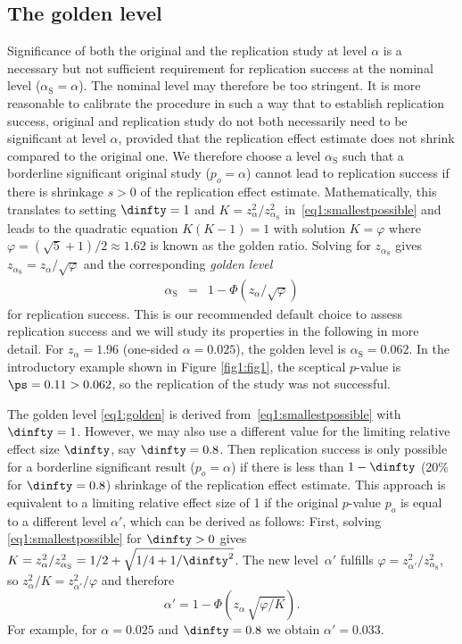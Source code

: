 \subsection{The golden level}\label{sec1:goldenthresh}
Significance of both the original and the replication study at level $\alpha$ is
a necessary but not sufficient requirement for replication success at the
nominal level ($\alpha_{\mathrm{S}} = \alpha$). The nominal level may therefore
be too stringent. It is more reasonable to calibrate the procedure in such a way
that to establish replication success, original and replication study do not
both necessarily need to be significant at level $\alpha$, provided that the
replication effect estimate does not shrink compared to the original one. We
therefore choose a level $\alpha_{\mathrm{S}}$ such that a borderline
significant original study ($p_o = \alpha$) cannot lead to replication success
if there is shrinkage $s > 0$ of the replication effect estimate.
Mathematically, this translates to setting $\dinfty = 1$ and
\mbox{$K = z_\alpha^2/z_{\alpha_{\mathrm{S}}}^2$}
in~\eqref{eq1:smallestpossible} and leads to the quadratic equation $K(K-1) = 1$
with solution $K = \varphi$ where \mbox{$\varphi = (\sqrt{5}+1)/2 \approx 1.62$}
is known as the golden ratio. Solving for $z_{\alpha_{\mathrm{S}}}$ gives
$z_{\alpha_{\mathrm{S}}} = z_\alpha / \sqrt{\varphi}$ and the corresponding
\textit{golden level}
\begin{eqnarray}\label{eq1:golden}
\alpha_{\mathrm{S}} & = & 1 -  \Phi(z_\alpha / \sqrt{\varphi} )
\end{eqnarray}
for replication success. This is our recommended default choice to assess
replication success and we will study its properties in the following in more
detail. For $z_\alpha = 1.96$ (one-sided $\alpha = 0.025$), the golden level is
$\alpha_{\mathrm{S}} =0.062$. In the introductory example shown in Figure
\ref{fig1:fig1}, the sceptical $p$-value is $\ps=0.11 > 0.062$, so the
replication of the \citet{Pyc2010} study was not successful.




The golden level \eqref{eq1:golden} is derived from~\eqref{eq1:smallestpossible}
with $\dinfty = 1$. However, we may also use a different value for the limiting
relative effect size $\dinfty$, say $\dinfty=0.8$. Then replication success is
only possible for a borderline significant result ($p_o = \alpha$) if there is
less than $1-\dinfty$ (20\% for \mbox{$\dinfty=0.8$}) shrinkage of the
replication effect estimate. This approach is equivalent to a limiting relative
effect size of 1 if the original $p$-value $p_o$ is equal to a different level
$\alpha'$, which can be derived as follows: First, solving
\eqref{eq1:smallestpossible} for $\dinfty > 0$ gives
$K = z_\alpha^2/z_{\alpha_{\mathrm{S}}}^2 = 1/2+\sqrt{1/4 + 1/\dinfty^2}$. The
new level~$\alpha'$ fulfills $\varphi=z_{\alpha'}^2/z_{\alpha_{\mathrm{S}}}^2$,
so $z_\alpha^2/K=z_{\alpha'}^2/\varphi$ and therefore
\begin{equation}\label{eq1:alphaPrime}
\alpha' = 1-\Phi\left(z_{\alpha} \, \sqrt{\varphi / K} \right).
\end{equation}
For example, for $\alpha = 0.025$ and $\dinfty = 0.8$ we obtain $\alpha'=0.033$.


